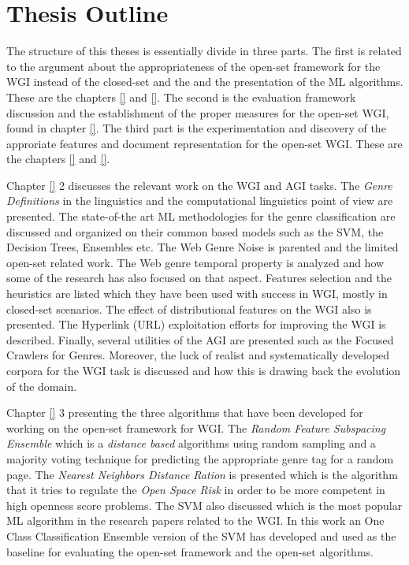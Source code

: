 \section{Thesis Outline} \label{chap:Introduction:sec:thesis_outline}

The structure of this theses is essentially divide in three parts. The first is related to the argument about the appropriateness of the open-set framework for the WGI instead of the closed-set and the and the presentation of the ML algorithms. These are the chapters \ref{} and \ref{}. The second is the evaluation framework discussion and the establishment of the proper measures for the open-set WGI, found in chapter \ref{}. The third part is the experimentation and discovery of the approriate features and document representation for the open-set WGI. These are the chapters \ref{} and \ref{}.

Chapter \ref{} 2  discusses the relevant work on the WGI and AGI tasks. The \textit{Genre Definitions} in the linguistics and the computational linguistics point of view are presented. The state-of-the art ML methodologies for the genre classification are discussed and organized on their common based models such as the SVM, the Decision Trees, Ensembles etc. The Web Genre Noise is parented and the limited open-set related work. The Web genre temporal property is analyzed and how some of the research has also focused on that aspect. Features selection and  the heuristics are listed which they have been used with success in WGI, mostly in closed-set scenarios. The effect of distributional features on the WGI also is presented. The Hyperlink (URL) exploitation efforts for improving the WGI is described. Finally, several utilities of the AGI are presented such as the Focused Crawlers for Genres. Moreover, the luck of realist and systematically developed corpora for the WGI task is discussed and how this is drawing back the evolution of the domain. 

Chapter \ref{} 3 presenting the three algorithms that have been developed for working on the open-set framework for WGI. The \textit{Random Feature Subspacing Ensemble} which is a \textit{distance based} algorithms using random sampling and a majority voting technique for predicting the appropriate genre tag for a random page. The \textit{Nearest Neighbors Distance Ration} is presented which is the algorithm that it tries to regulate the \textit{Open Space Risk} in order to be more competent in high openness score problems. The SVM also discussed which is the most popular ML algorithm in the research papers related to the WGI. In this work an One Class Classification Ensemble version of the SVM has developed and used as the baseline for evaluating the open-set framework and the open-set algorithms. 


